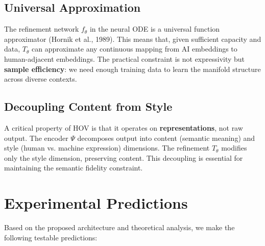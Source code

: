 \documentclass[12pt,oneside]{article}
\begin{document}
\subsection{Universal Approximation}

The refinement network $f_\theta$ in the neural ODE is a universal function approximator (Hornik et al., 1989). This means that, given sufficient capacity and data, $T_\theta$ can approximate any continuous mapping from AI embeddings to human-adjacent embeddings. The practical constraint is not expressivity but \textbf{sample efficiency}: we need enough training data to learn the manifold structure across diverse contexts.

\subsection{Decoupling Content from Style}

A critical property of HOV is that it operates on \textbf{representations}, not raw output. The encoder $\Psi$ decomposes output into content (semantic meaning) and style (human vs. machine expression) dimensions. The refinement $T_\theta$ modifies only the style dimension, preserving content. This decoupling is essential for maintaining the semantic fidelity constraint.

\section{Experimental Predictions}

Based on the proposed architecture and theoretical analysis, we make the following testable predictions:
\end{document}
